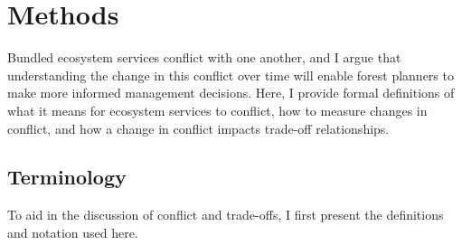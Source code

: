 \section{Methods}
\label{sec:methods}
%
%

Bundled ecosystem services conflict with one another, and I argue that understanding the change in this conflict over time will enable forest planners to make more informed management decisions. Here, I provide formal definitions of what it means for ecosystem services to conflict, how to measure changes in conflict, and how a change in conflict impacts trade-off relationships.

\subsection{Terminology}
To aid in the discussion of conflict and trade-offs, I first present the definitions and notation used here.

\label{subsec:terminology}
